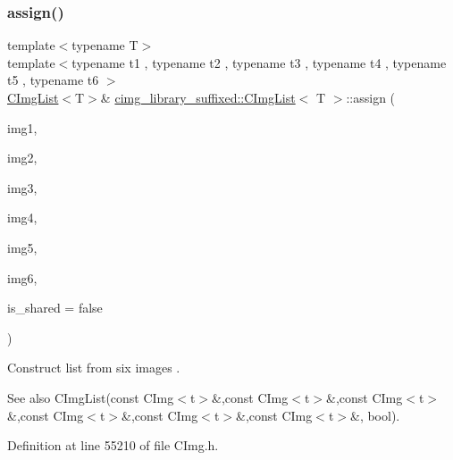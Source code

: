 \subsubsection{\texorpdfstring{assign()}{assign()}\hspace{0.1cm}{\footnotesize\ttfamily [13/18]}}
{\footnotesize\ttfamily template$<$typename T$>$ \\
template$<$typename t1 , typename t2 , typename t3 , typename t4 , typename t5 , typename t6 $>$ \\
\hyperlink{structcimg__library__suffixed_1_1CImgList}{C\+Img\+List}$<$T$>$\& \hyperlink{structcimg__library__suffixed_1_1CImgList}{cimg\+\_\+library\+\_\+suffixed\+::\+C\+Img\+List}$<$ T $>$\+::assign (\begin{DoxyParamCaption}\item[{const \hyperlink{structcimg__library__suffixed_1_1CImg}{C\+Img}$<$ t1 $>$ \&}]{img1,  }\item[{const \hyperlink{structcimg__library__suffixed_1_1CImg}{C\+Img}$<$ t2 $>$ \&}]{img2,  }\item[{const \hyperlink{structcimg__library__suffixed_1_1CImg}{C\+Img}$<$ t3 $>$ \&}]{img3,  }\item[{const \hyperlink{structcimg__library__suffixed_1_1CImg}{C\+Img}$<$ t4 $>$ \&}]{img4,  }\item[{const \hyperlink{structcimg__library__suffixed_1_1CImg}{C\+Img}$<$ t5 $>$ \&}]{img5,  }\item[{const \hyperlink{structcimg__library__suffixed_1_1CImg}{C\+Img}$<$ t6 $>$ \&}]{img6,  }\item[{const bool}]{is\+\_\+shared = {\ttfamily false} }\end{DoxyParamCaption})\hspace{0.3cm}{\ttfamily [inline]}}



Construct list from six images . 

\begin{DoxySeeAlso}{See also}
C\+Img\+List(const C\+Img$<$t$>$\&,const C\+Img$<$t$>$\&,const C\+Img$<$t$>$\&,const C\+Img$<$t$>$\&,const C\+Img$<$t$>$\&,const C\+Img$<$t$>$\&, bool). 
\end{DoxySeeAlso}


Definition at line 55210 of file C\+Img.\+h.

\mbox{\label{structcimg__library__suffixed_1_1CImgList_a2aaaeaedf65793e5c8c2dcfec80db12d}} 
